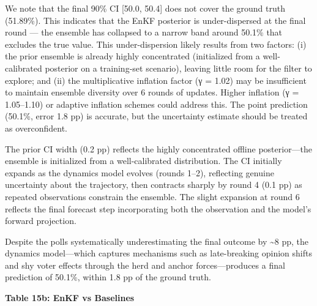 \documentclass[
]{article}
\begin{document}
We note that the final 90\% CI {[}50.0, 50.4{]} does not cover the
ground truth (51.89\%). This indicates that the EnKF posterior is
under-dispersed at the final round --- the ensemble has collapsed to a
narrow band around 50.1\% that excludes the true value. This
under-dispersion likely results from two factors: (i) the prior ensemble
is already highly concentrated (initialized from a well-calibrated
posterior on a training-set scenario), leaving little room for the
filter to explore; and (ii) the multiplicative inflation factor (γ =
1.02) may be insufficient to maintain ensemble diversity over 6 rounds
of updates. Higher inflation (γ = 1.05--1.10) or adaptive inflation
schemes could address this. The point prediction (50.1\%, error 1.8 pp)
is accurate, but the uncertainty estimate should be treated as
overconfident.

The prior CI width (0.2 pp) reflects the highly concentrated offline
posterior---the ensemble is initialized from a well-calibrated
distribution. The CI initially expands as the dynamics model evolves
(rounds 1--2), reflecting genuine uncertainty about the trajectory, then
contracts sharply by round 4 (0.1 pp) as repeated observations constrain
the ensemble. The slight expansion at round 6 reflects the final
forecast step incorporating both the observation and the model's forward
projection.

Despite the polls systematically underestimating the final outcome by
\textasciitilde8 pp, the dynamics model---which captures mechanisms such
as late-breaking opinion shifts and shy voter effects through the herd
and anchor forces---produces a final prediction of 50.1\%, within 1.8 pp
of the ground truth.

\textbf{Table 15b: EnKF vs Baselines}
\end{document}
